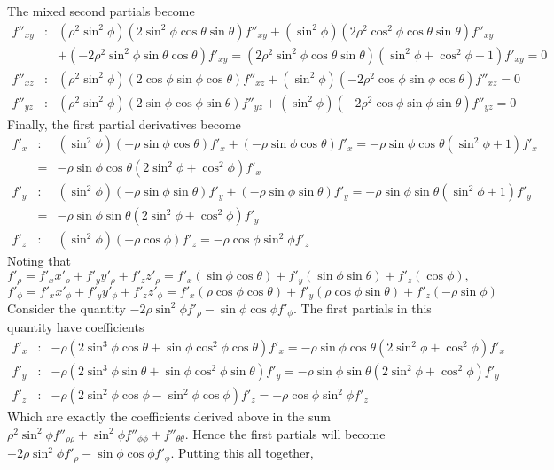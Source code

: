 \documentclass[12pt]{amsbook}
\begin{document}
The mixed second partials become
\begin{eqnarray*}
f''_{xy}&:&(\rho^2\sin^2\phi)(2\sin^2 \phi \cos \theta\sin \theta)f''_{xy}+(\sin^2\phi)(2\rho^2 \cos^2 \phi \cos \theta \sin \theta)f''_{xy} \\
&&+(-2\rho^2 \sin^2 \phi \sin \theta\cos \theta)f'_{xy}=(2\rho^2\sin^2\phi\cos\theta\sin\theta)(\sin^2\phi+\cos^2\phi-1)f'_{xy}=0\\
f''_{xz}&:&(\rho^2\sin^2\phi)(2\cos \phi\sin \phi \cos \theta)f''_{xz}+(\sin^2\phi)(-2\rho^2 \cos \phi \sin \phi \cos \theta)f''_{xz}=0\\
f''_{yz}&:&(\rho^2\sin^2\phi)(2\sin \phi\cos \phi \sin \theta)f''_{yz}+(\sin^2\phi)(-2\rho^2 \cos \phi\sin \phi \sin \theta)f''_{yz}=0
\end{eqnarray*}
Finally, the first partial derivatives become
\begin{eqnarray*}
f'_x&:&(\sin^2\phi)(-\rho\sin \phi\cos \theta)f'_x+(-\rho\sin\phi\cos \theta)f'_x=-\rho\sin\phi\cos\theta(\sin^2\phi+1)f'_x \\
&=&-\rho\sin\phi\cos\theta(2\sin^2\phi+\cos^2\phi)f'_x \\
f'_y&:&(\sin^2\phi)(-\rho\sin \phi\sin \theta)f'_y+(-\rho\sin\phi\sin \theta)f'_y=-\rho\sin\phi\sin\theta(\sin^2\phi+1)f'_y \\
&=&-\rho\sin\phi\sin\theta(2\sin^2\phi+\cos^2\phi)f'_y \\
f'_z&:&(\sin^2\phi)(-\rho\cos\phi)f'_z=-\rho\cos\phi\sin^2\phi f'_z 
\end{eqnarray*}
Noting that 
$$f'_{\rho}=f'_xx'_{\rho}+f'_yy'_{\rho}+f'_zz'_{\rho}=f'_x(\sin\phi\cos\theta)+f'_y(\sin\phi\sin\theta)+f'_z(\cos\phi),$$ 
$$f'_{\phi}=f'_xx'_{\phi}+f'_yy'_{\phi}+f'_zz'_{\phi}=f'_x(\rho\cos\phi\cos\theta)+f'_y(\rho\cos\phi\sin\theta)+f'_z(-\rho\sin\phi)$$
Consider the quantity $-2\rho\sin^2\phi f'_{\rho}-\sin\phi\cos\phi f'_{\phi}$. The first partials in this quantity have coefficients
\begin{eqnarray*}
f'_x&:&-\rho(2\sin^3\phi\cos\theta+\sin \phi\cos^2\phi\cos\theta)f'_x=-\rho\sin\phi\cos\theta(2\sin^2\phi+\cos^2\phi)f'_x \\
f'_y&:&-\rho(2\sin^3\phi\sin\theta+\sin \phi\cos^2\phi\sin\theta)f'_y=-\rho\sin\phi\sin\theta(2\sin^2\phi+\cos^2\phi)f'_y \\
f'_z&:&-\rho(2\sin^2\phi\cos\phi-\sin^2\phi\cos\phi)f'_z=-\rho\cos\phi\sin^2\phi f'_z
\end{eqnarray*}
Which are exactly the coefficients derived above in the sum $\rho^2\sin^2\phi f''_{\rho\rho}+\sin^2\phi f''_{\phi\phi}+f''_{\theta\theta}$. Hence the first partials will become $-2\rho\sin^2\phi f'_{\rho}-\sin\phi\cos\phi f'_{\phi}$. Putting this all together,
\end{document}
